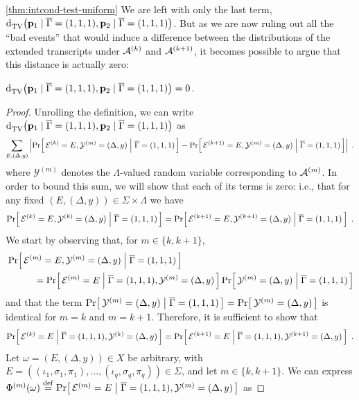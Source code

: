 \begin{proofof}{\cref{thm:intcond-test-uniform}}
We are left with only the last term, ${\operatorname{d}_{\rm{TV}}^{}\!\left({ \mathbf{p}_1 \;\vert\;  \overline{\Gamma} = (1,1,1) ,  \mathbf{p}_2 \;\vert\; \overline{\Gamma} = (1,1,1) }\right)}$. But as we are now ruling out all the ``bad events'' that would induce a difference between the distributions of the extended transcripts under $\mathcal{A}^{(k)}$ and $\mathcal{A}^{(k+1)}$, it becomes possible to argue that this distance is actually zero:
\begin{claim}\label{claim:adapt:tv:all:is:good}
  ${\operatorname{d}_{\rm{TV}}^{}\!\left({ \mathbf{p}_1 \;\vert\;  \overline{\Gamma} = (1,1,1) ,  \mathbf{p}_2 \;\vert\; \overline{\Gamma} = (1,1,1) }\right)} = 0$.
\end{claim}
\begin{proof}
Unrolling the definition, we can write  ${\operatorname{d}_{\rm{TV}}^{}\!\left({ \mathbf{p}_1 \;\vert\;  \overline{\Gamma} = (1,1,1) ,  \mathbf{p}_2 \;\vert\; \overline{\Gamma} = (1,1,1) }\right)}$ as
\[
\sum_{E,(\Delta,y)} \left\lvert  \Pr\!\left[\,  \mathcal{E}^{(k)}=E, \mathcal{Y}^{(m)}=(\Delta,y)  \;\middle\vert\;  \overline{\Gamma} = (1,1,1) \, \right] - \Pr\!\left[\,  \mathcal{E}^{(k+1)}=E,\mathcal{Y}^{(m)}=(\Delta,y)  \;\middle\vert\;  \overline{\Gamma} = (1,1,1) \, \right]  \right\rvert\;.
\]
where $\mathcal{Y}^{(m)}$ denotes the $\Lambda$-valued random variable corresponding to $\mathcal{A}^{(m)}$. In order to bound this sum, we will show that each of its terms is zero: i.e., that for
any fixed $(E,(\Delta,y))\in\Sigma\times\Lambda$ we have
\[
\Pr\!\left[\,  \mathcal{E}^{(k)}=E,\mathcal{Y}^{(k)}=(\Delta,y)  \;\middle\vert\;  \overline{\Gamma} = (1,1,1) \, \right]=\Pr\!\left[\,  \mathcal{E}^{(k+1)}=E,\mathcal{Y}^{(k+1)}=(\Delta,y)  \;\middle\vert\;  \overline{\Gamma} = (1,1,1) \, \right] \;.
\]
We start by observing that, for $m\in\{k,k+1\}$,
\begin{align*}
  &\Pr\!\left[\,  \mathcal{E}^{(m)}=E, \mathcal{Y}^{(m)}=(\Delta,y)  \;\middle\vert\;  \overline{\Gamma} = (1,1,1) \, \right] \\
  &\qquad\quad=
  \Pr\!\left[\,  \mathcal{E}^{(m)}=E  \;\middle\vert\;  \overline{\Gamma} = (1,1,1), \mathcal{Y}^{(m)}=(\Delta,y) \, \right]\Pr\!\left[\, \mathcal{Y}^{(m)}=(\Delta,y) \;\middle\vert\; \overline{\Gamma} = (1,1,1)\, \right]
\end{align*}
and that the term $\Pr\!\left[\, \mathcal{Y}^{(m)}=(\Delta,y) \;\middle\vert\; \overline{\Gamma} = (1,1,1)\, \right] = \Pr\!\left[\, \mathcal{Y}^{(m)}=(\Delta,y)\, \right]$ is identical for $m=k$ and $m=k+1$. Therefore, it is sufficient to show that
\[
   \Pr\!\left[\,  \mathcal{E}^{(k)}=E  \;\middle\vert\;  \overline{\Gamma} = (1,1,1), \mathcal{Y}^{(k)}=(\Delta,y) \, \right] = \Pr\!\left[\,  \mathcal{E}^{(k+1)}=E  \;\middle\vert\;  \overline{\Gamma} = (1,1,1), \mathcal{Y}^{(k+1)}=(\Delta,y) \, \right]\;.
\]
\noindent Let $\omega=(E,(\Delta,y))\in X$ be arbitrary, with $E=((\iota_1, \sigma_1, \pi_1),\dots,(\iota_q, \sigma_q, \pi_q))\in\Sigma$, and let $m\in\{k,k+1\}$. We can express $\Phi^{(m)}(\omega)\stackrel{\rm def}{=}\Pr\!\left[\,  \mathcal{E}^{(m)}=E  \;\middle\vert\;  \overline{\Gamma} = (1,1,1), \mathcal{Y}^{(m)}=(\Delta,y)  \, \right]$ as

\end{proof}
\end{proofof}
